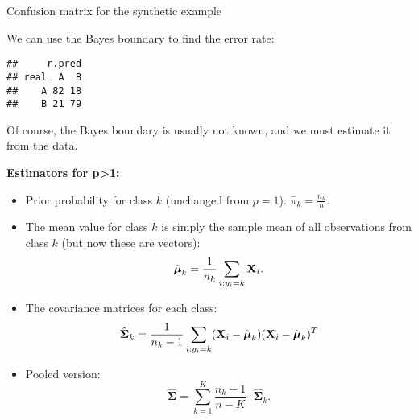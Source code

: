 \documentclass[10pt,ignorenonframetext,]{beamer}
\newenvironment{Shaded}{\begin{snugshade}}{\end{snugshade}}
\newcommand{\DataTypeTok}[1]{\textcolor[rgb]{0.13,0.29,0.53}{#1}}
\newcommand{\DecValTok}[1]{\textcolor[rgb]{0.00,0.00,0.81}{#1}}
\newcommand{\KeywordTok}[1]{\textcolor[rgb]{0.13,0.29,0.53}{\textbf{#1}}}
\newcommand{\NormalTok}[1]{#1}
\newcommand{\OperatorTok}[1]{\textcolor[rgb]{0.81,0.36,0.00}{\textbf{#1}}}
\newcommand{\StringTok}[1]{\textcolor[rgb]{0.31,0.60,0.02}{#1}}
\begin{document}
\begin{frame}[fragile]

\begin{block}{Confusion matrix for the synthetic example}

\vspace{2mm}

We can use the Bayes boundary to find the error rate:

\vspace{2mm}

\scriptsize

\begin{Shaded}
\end{Shaded}

\begin{verbatim}
##     r.pred
## real  A  B
##    A 82 18
##    B 21 79
\end{verbatim}

\vspace{6mm}

\normalsize

Of course, the Bayes boundary is usually not known, and we must estimate
it from the data.

\end{block}

\end{frame}

\begin{frame}

\textbf{Estimators for p\textgreater{}1:}

\begin{itemize}
\item
  Prior probability for class \(k\) (unchanged from \(p=1\)):
  \(\hat{\pi}_k = \frac{n_k}{n}.\)
\item
  The mean value for class \(k\) is simply the sample mean of all
  observations from class \(k\) (but now these are vectors):
  \[\hat{\boldsymbol{\mu}}_k = \frac{1}{n_k}\sum_{i:y_i=k} {\bf X}_i.\]
\item
  The covariance matrices for each class:
  \[\hat{\boldsymbol{\Sigma}}_k=\frac{1}{n_k-1}\sum_{i:y_i=k} ({\bf X}_i-\hat{\boldsymbol{\mu}}_k ) ({\bf X}_i-\hat{\boldsymbol{\mu}}_k)^T\]
\item
  Pooled version:
  \[\hat{\boldsymbol{\Sigma}}= \sum_{k=1}^K \frac{n_k - 1}{n - K} \cdot \hat{\boldsymbol{\Sigma}}_k.\]
\end{itemize}

\end{frame}
\end{document}

